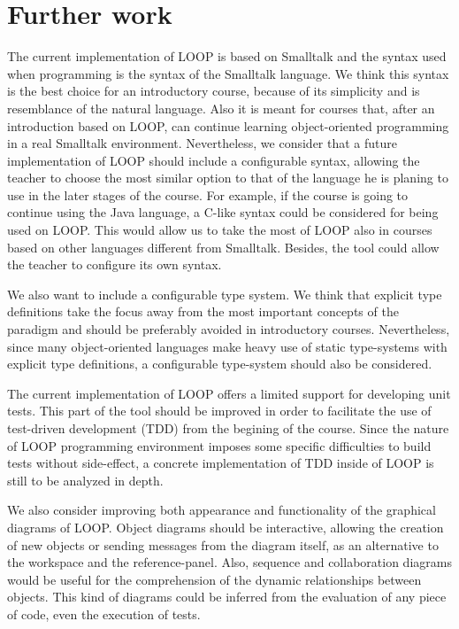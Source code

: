 \documentclass{sigplanconf}
\begin{document}
\section{Further work}

The current implementation of LOOP is based on Smalltalk and the syntax used when programming is the syntax of the Smalltalk language. We think this syntax is the best choice for an introductory course, because of its simplicity and is resemblance of the natural language. Also it is meant for courses that, after an introduction based on LOOP, can continue learning object-oriented programming in a real Smalltalk environment. Nevertheless, we consider that a future implementation of LOOP should include a configurable syntax, allowing the teacher to choose the most similar option to that of the language he is planing to use in the later stages of the course. For example, if the course is going to continue using the Java language, a C-like syntax could be considered for being used on LOOP. This would allow us to take the most of LOOP also in courses based on other languages different from Smalltalk. Besides, the tool could allow the teacher to configure its own syntax.

We also want to include a configurable type system. We think that explicit type definitions take the focus away from the most important concepts of the paradigm and should be preferably avoided in introductory courses. Nevertheless, since many object-oriented languages make heavy use of static type-systems with explicit type definitions, a configurable type-system should also be considered.

The current implementation of LOOP offers a limited support for developing unit tests. This part of the tool should be improved in order to facilitate the use of test-driven development (TDD) from the begining of the course. Since the nature of LOOP programming environment imposes some specific difficulties to build tests without side-effect, a concrete implementation of TDD inside of LOOP is still to be analyzed in depth.

We also consider improving both appearance and functionality of the graphical diagrams of LOOP. Object diagrams should be interactive, allowing the creation of new objects or sending messages from the diagram itself, as an alternative to the workspace and the reference-panel. Also, sequence and collaboration diagrams would be useful for the comprehension of the dynamic relationships between objects. This kind of diagrams could be inferred from the evaluation of any piece of code, even the execution of tests.
\end{document}
